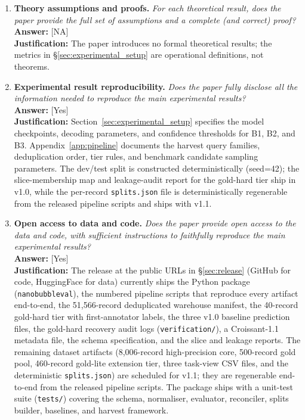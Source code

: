 \begin{enumerate}
\item \textbf{Theory assumptions and proofs.}
\emph{For each theoretical result, does the paper provide the full
set of assumptions and a complete (and correct) proof?}\\
\textbf{Answer:} [NA] \\
\textbf{Justification:} The paper introduces no formal theoretical
results; the metrics in \S\ref{sec:experimental_setup} are operational
definitions, not theorems.

\item \textbf{Experimental result reproducibility.}
\emph{Does the paper fully disclose all the information needed to
reproduce the main experimental results?}\\
\textbf{Answer:} [Yes] \\
\textbf{Justification:} Section~\ref{sec:experimental_setup} specifies the model
checkpoints, decoding parameters, and confidence thresholds for B1,
B2, and B3. Appendix~\ref{app:pipeline} documents the harvest query
families, deduplication order, tier rules, and benchmark candidate
sampling parameters. The dev/test split is constructed
deterministically (seed=42); the slice-membership map and
leakage-audit report for the gold-hard tier ship in v1.0, while the
per-record \texttt{splits.json} file is deterministically regenerable
from the released pipeline scripts and ships with v1.1.

\item \textbf{Open access to data and code.}
\emph{Does the paper provide open access to the data and code, with
sufficient instructions to faithfully reproduce the main experimental
results?}\\
\textbf{Answer:} [Yes] \\
\textbf{Justification:} The release at the public URLs in
\S\ref{sec:release} (GitHub for code, HuggingFace for data) currently
ships the Python package (\texttt{nanobubbleval}), the numbered
pipeline scripts that reproduce every artifact end-to-end, the
51{,}566-record deduplicated warehouse manifest, the 40-record
gold-hard tier with first-annotator labels, the three v1.0 baseline
prediction files, the gold-hard recovery audit logs
(\texttt{verification/}), a Croissant-1.1 metadata file, the schema
specification, and the slice and leakage reports. The remaining
dataset artifacts (8{,}006-record high-precision core, 500-record
gold pool, 460-record gold-lite extension tier, three task-view CSV
files, and the deterministic \texttt{splits.json}) are scheduled for
v1.1; they are regenerable end-to-end from the released pipeline
scripts. The package ships with a unit-test suite (\texttt{tests/})
covering the schema, normaliser, evaluator, reconciler, splits
builder, baselines, and harvest framework.


\end{enumerate}
